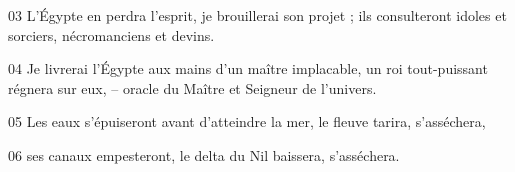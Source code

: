 
03 L’Égypte en perdra l’esprit, je brouillerai son projet ; ils consulteront idoles et sorciers, nécromanciens et devins.

04 Je livrerai l’Égypte aux mains d’un maître implacable, un roi tout-puissant régnera sur eux, – oracle du Maître et Seigneur de l’univers.

05 Les eaux s’épuiseront avant d’atteindre la mer, le fleuve tarira, s’asséchera,

06 ses canaux empesteront, le delta du Nil baissera, s’asséchera.
